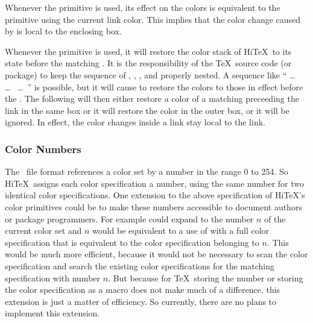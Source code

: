 Whenever the  primitive is used, its effect on the
colors is equivalent to the  primitive using the current
link color. This implies that the color change caused by 
is local to the enclosing box.

Whenever the  primitive is used, it will restore
the color stack of Hi\TeX\ to its state before the matching .
It is the responsibility of the \TeX\ source code (or package) to keep the
sequence of  , ,
, and  properly nested.
A sequence like  `` \dots\ 
 \dots\  \dots\ '' is possible,
but it will cause  to restore the colors to those
in effect before the .
The following  will then either restore
a color of a matching  preceeding
the link in the same box or it will restore the
color in the outer box, or it will be ignored.
In effect, the color changes inside a link stay local to the link.

\subsubsection{Color Numbers}
The \HINT\ file format references a color set by a number in the range
0 to 254.
So Hi\TeX\ assigns each color specification a number, using the same
number for two identical color specifications.
One extension to the above specification of Hi\TeX's color primitives
could be to make these numbers accessible to document authors or
package programmers. For example  could
expand to the number $n$ of the current color set and
$n$ would be equivalent to a use of 
with a full color specification that is equivalent to the color specification
belonging to $n$.
This would be much more efficient, because it would not be necessary
to scan the color specification and search the existing color specifications
for the matching specification with number $n$.
But because for \TeX\ storing the number or storing the color specification
as a macro does not make much of a difference, this extension is just
a matter of efficiency. So currently, there are no plans to implement
this extension.

